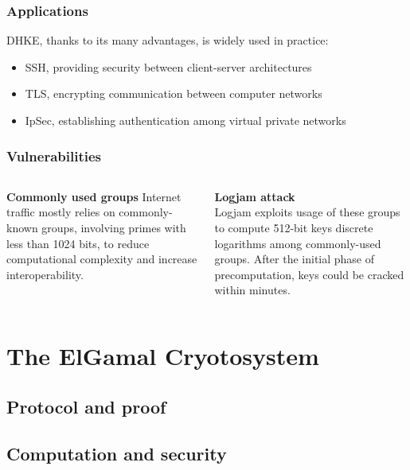 \documentclass{beamer}
\begin{document}

\begin{frame}
\frametitle{Applications}
DHKE, thanks to its many advantages, is widely used in practice:
\begin{itemize}
    \item SSH, providing security between client-server architectures
    \item TLS, encrypting communication between computer networks
    \item IpSec, establishing authentication among virtual private networks
\end{itemize}

\end{frame}


\begin{frame}
\frametitle{Vulnerabilities}
\begin{columns}[c]
\textbf{Commonly used groups}
Internet traffic mostly relies on commonly-known groups, involving primes with less than 1024 bits, to reduce computational complexity and increase interoperability.

\textbf{Logjam attack}\\
Logjam exploits usage of these groups to compute 512-bit keys discrete logarithms among commonly-used groups. After the initial phase of precomputation, keys could be cracked within minutes.
\end{columns}

\end{frame}



\section{The ElGamal Cryotosystem}
\subsection{Protocol and proof}
\subsection{Computation and security}
\end{document}
